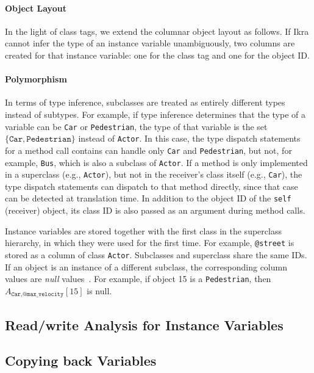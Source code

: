 \documentclass[preprint]{sigplanconf}
\begin{document}
\paragraph{Object Layout}
In the light of class tags, we extend the columnar object layout as follows. If Ikra cannot infer the type of an instance variable unambiguously, two columns are created for that instance variable: one for the class tag and one for the object ID.

\paragraph{Polymorphism}
In terms of type inference, subclasses are treated as entirely different types instead of subtypes. For example, if type inference determines that the type of a variable can be \texttt{Car} or \texttt{Pedestrian}, the type of that variable is the set $\{\texttt{Car}, \texttt{Pedestrian}\}$ instead of \texttt{Actor}. In this case, the type dispatch statements for a method call contains can handle only \texttt{Car} and \texttt{Pedestrian}, but not, for example, \texttt{Bus}, which is also a subclass of \texttt{Actor}. If a method is only implemented in a superclass (e.g., \texttt{Actor}), but not in the receiver's class itself (e.g., \texttt{Car}), the type dispatch statements can dispatch to that method directly, since that case can be detected at translation time. In addition to the object ID of the \texttt{self} (receiver) object, its class ID is also passed as an argument during method calls.

Instance variables are stored together with the first class in the superclass hierarchy, in which they were used for the first time. For example, \texttt{@street} is stored as a column of class \texttt{Actor}. Subclasses and superclass share the same IDs. If an object is an instance of a different subclass, the corresponding column values are \emph{null} values~\cite{Mattis:2015:COI:2814228.2814230}. For example, if object 15 is a \texttt{Pedestrian}, then $A_{\texttt{Car}, \texttt{@max\_velocity}}[15]$ is null.

\subsection{Read/write Analysis for Instance Variables}

\subsection{Copying back Variables}
\label{sec:impl_copyback}
\end{document}
